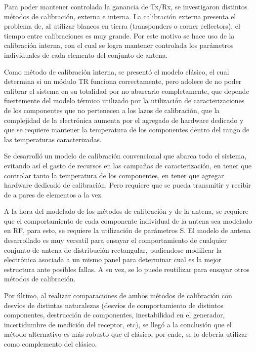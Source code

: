Para poder mantener controlada la ganancia de Tx/Rx, se investigaron distintos métodos de calibración, externa e interna. La 
calibración externa presenta el problema de, al utilizar blancos en tierra (transponders o corner reflectors), el tiempo entre 
calibraciones es muy grande. Por este motivo se hace uso de la calibración interna, con el cual se logra mantener controlada 
los parámetros individuales de cada elemento del conjunto de antena. 

Como método de calibración interna, se presentó el modelo clásico, el cual determina si un módulo TR funciona correctamente, 
pero adolece de no poder calibrar el sistema en su totalidad por no abarcarlo completamente, que depende 
fuertemente del modelo térmico utilizado por la utilización de caracterizaciones de los componentes que no pertenecen a los 
lazos de calibración, que la complejidad de la electrónica aumenta por el agregado de hardware dedicado y que se requiere 
mantener la temperatura de los componentes dentro del rango de las temperaturas caracterizadas.

Se desarrolló un modelo de calibración convencional que abarca todo el sistema, evitando así el gasto de recursos en las 
campañas de caracterización, en tener que controlar tanto la temperatura de los componentes, en tener que agregar hardware 
dedicado de calibración. Pero requiere que se pueda transmitir y recibir de a pares de elementos a la vez. 

A la hora del modelado de los métodos de calibración y de la antena, se requiere que el comportamiento de cada componente 
individual de la antena sea modelado en RF, para esto, se requiere la utilización de parámetros S. El modelo de antena 
desarrollado es muy versatil para ensayar el comportamiento de cualquier conjunto de antena de distribución rectangular, 
pudiendose modificar la electrónica asociada a un mismo panel para determinar cual es la mejor estructura ante posibles fallas.
A su vez, se lo puede reutilizar para ensayar otros métodos de calibración.

Por último, al realizar comparaciones de ambos métodos de calibración con desvíos de distintas naturalezas (desvíos de 
comportamiento de distintos componentes, destrucción de componentes, inestabilidad en el generador, incertidumbre de medición 
del receptor, etc), se llegó a la conclusión que el método alternativo es más robusto que el clásico, por ende, se lo 
debería utilizar como complemento del clásico.

